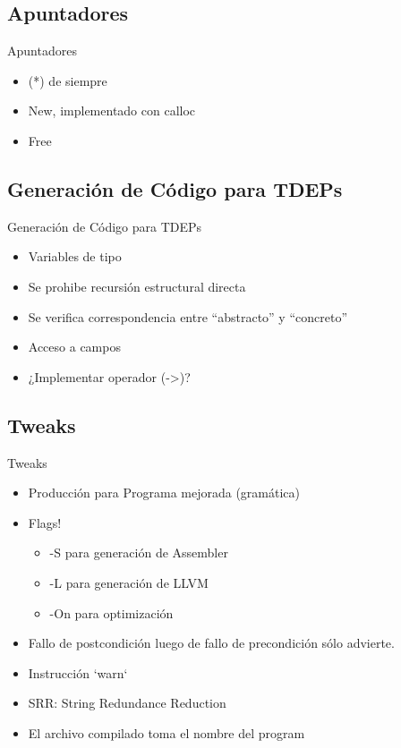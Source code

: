 \documentclass{beamer}
\begin{document}
\subsection{Apuntadores}
\begin{frame}{Apuntadores}
\begin{itemize}
  \item (*) de siempre
  \item New, implementado con calloc
  \item Free
\end{itemize}
\end{frame}

\subsection{Generación de Código para TDEPs}
\begin{frame}{Generación de Código para TDEPs}
\begin{itemize}
    \item Variables de tipo
    \item Se prohibe recursión estructural directa
    \item Se verifica correspondencia entre ``abstracto'' y ``concreto''
    \item Acceso a campos
    \item ¿Implementar operador (->)?
\end{itemize}
\end{frame}

\subsection{Tweaks}
\begin{frame}{Tweaks}
\begin{itemize}
  \item  Producción para Programa mejorada (gramática)




  \item Flags!
    \begin {itemize}
      \item -S para generación de Assembler
      \item -L para generación de LLVM
      \item -On para optimización
    \end {itemize}
  \item Fallo de postcondición luego de fallo de precondición sólo advierte.
  \item Instrucción `warn`
  \item SRR: String Redundance Reduction
  \item El archivo compilado toma el nombre del program
\end{itemize}
\end{frame}
\end{document}
